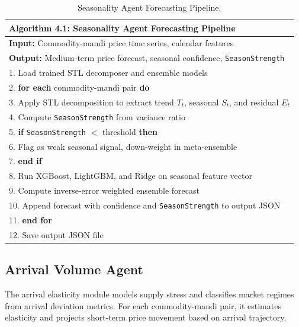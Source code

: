 \documentclass[12pt,a4paper]{report}
\theoremstyle{definition}
\theoremstyle{remark}
\begin{document}
\begin{table}[htbp]
\centering
\caption{Seasonality Agent Forecasting Pipeline.}
\label{alg:seasonality}
\begin{tabular}{p{14cm}}
\hline
\textbf{Algorithm 4.1:} Seasonality Agent Forecasting Pipeline \\
\hline
\textbf{Input:} Commodity-mandi price time series, calendar features \\
\textbf{Output:} Medium-term price forecast, seasonal confidence, \texttt{SeasonStrength} \\
\hline
1. Load trained STL decomposer and ensemble models \\
2. \textbf{for each} commodity-mandi pair \textbf{do} \\
3. \quad Apply STL decomposition to extract trend $T_t$, seasonal $S_t$, and residual $E_t$ \\
4. \quad Compute \texttt{SeasonStrength} from variance ratio \\
5. \quad \textbf{if} \texttt{SeasonStrength} $<$ threshold \textbf{then} \\
6. \quad\quad Flag as weak seasonal signal, down-weight in meta-ensemble \\
7. \quad \textbf{end if} \\
8. \quad Run XGBoost, LightGBM, and Ridge on seasonal feature vector \\
9. \quad Compute inverse-error weighted ensemble forecast \\
10. \quad Append forecast with confidence and \texttt{SeasonStrength} to output JSON \\
11. \textbf{end for} \\
12. Save output JSON file \\
\hline
\end{tabular}
\end{table}

\subsection{Arrival Volume Agent}

The arrival elasticity module models supply stress and classifies market regimes from arrival deviation metrics. For each commodity-mandi pair, it estimates elasticity and projects short-term price movement based on arrival trajectory.
\end{document}
